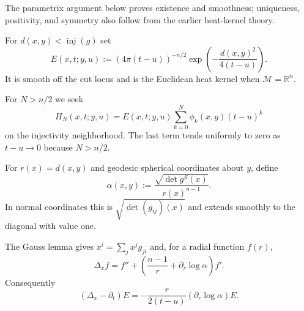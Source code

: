 \begin{remark}
\label{rem:chow-iii-ch23-properties-elsewhere}

The parametrix argument below proves existence and smoothness; uniqueness,
positivity, and symmetry also follow from the earlier heat-kernel theory.
\end{remark}

\begin{definition}
\label{def:chow-iii-ch23-transplanted-kernel}

For $d(x,y)<\operatorname{inj}(g)$ set
\[
E(x,t;y,u):=(4\pi(t-u))^{-n/2}
 \exp\!\left(-\frac{d(x,y)^2}{4(t-u)}\right).
\]
It is smooth off the cut locus and is the Euclidean heat kernel when
$\mathcal M=\mathbb R^n$.
\end{definition}

\begin{remark}
\label{rem:chow-iii-ch23-finite-approximation}

For $N>n/2$ we seek
\[
H_N(x,t;y,u)=E(x,t;y,u)\sum_{k=0}^N\phi_k(x,y)(t-u)^k
\]
on the injectivity neighborhood.  The last term tends uniformly to zero as
$t-u\to0$ because $N>n/2$.
\end{remark}

\begin{definition}
\label{def:chow-iii-ch23-normal-jacobian}

For $r(x)=d(x,y)$ and geodesic spherical coordinates about $y$, define
\[
\alpha(x,y):=\frac{\sqrt{\det g^S(x)}}{r(x)^{n-1}}.
\]
In normal coordinates this is $\sqrt{\det(g_{ij})(x)}$ and extends smoothly
to the diagonal with value one.
\end{definition}

\begin{remark}
\label{rem:chow-iii-ch23-gauss-lemma}

The Gauss lemma gives $x^i=\sum_jx^jg_{ji}$ and, for a radial function $f(r)$,
\[
\Delta_xf=f''+\left(\frac{n-1}{r}+\partial_r\log\alpha\right)f'.
\]
Consequently
\[
(\Delta_x-\partial_t)E=-\frac r{2(t-u)}(\partial_r\log\alpha)E.
\]
\end{remark}

